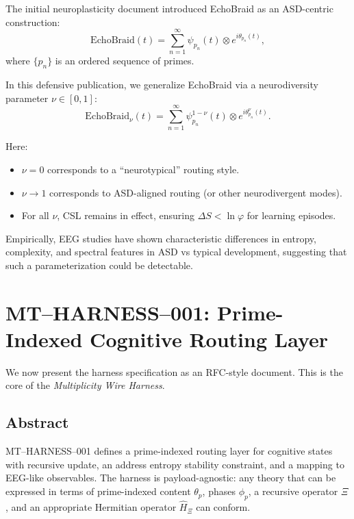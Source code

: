\documentclass[11pt]{article}
\begin{document}
The initial neuroplasticity document introduced EchoBraid as an ASD-centric construction:
\begin{equation}
\mathrm{EchoBraid}(t) = \sum_{n=1}^{\infty} \psi_{p_n}(t) \otimes e^{i \theta_{p_n}(t)},
\end{equation}
where $\{p_n\}$ is an ordered sequence of primes. \cite{neuroplasticityMT}

In this defensive publication, we generalize EchoBraid via a neurodiversity parameter $\nu \in [0,1]$:
\begin{equation}
\mathrm{EchoBraid}_\nu(t) = \sum_{n=1}^{\infty} \psi_{p_n}^{1-\nu}(t) \otimes e^{i \theta_{p_n}^{\nu}(t)}.
\end{equation}

Here:

\begin{itemize}[noitemsep]
  \item $\nu = 0$ corresponds to a ``neurotypical'' routing style.
  \item $\nu \to 1$ corresponds to ASD-aligned routing (or other neurodivergent modes).
  \item For all $\nu$, CSL remains in effect, ensuring $\Delta S < \ln \varphi$ for learning episodes.
\end{itemize}

Empirically, EEG studies have shown characteristic differences in entropy, complexity, and spectral features in ASD vs typical development, suggesting that such a parameterization could be detectable. \cite{EEGEntropyASD,EEGEntropyASD2,EEGEntropyASD3}

\section{MT--HARNESS--001: Prime-Indexed Cognitive Routing Layer}

We now present the harness specification as an RFC-style document. This is the core of the \emph{Multiplicity Wire Harness}.

\subsection{Abstract}

MT--HARNESS--001 defines a prime-indexed routing layer for cognitive states with recursive update, an address entropy stability constraint, and a mapping to EEG-like observables. The harness is payload-agnostic: any theory that can be expressed in terms of prime-indexed content $\theta_p$, phases $\phi_p$, a recursive operator $\Xi$, and an appropriate Hermitian operator $\hat{H}_\Xi$ can conform.
\end{document}
